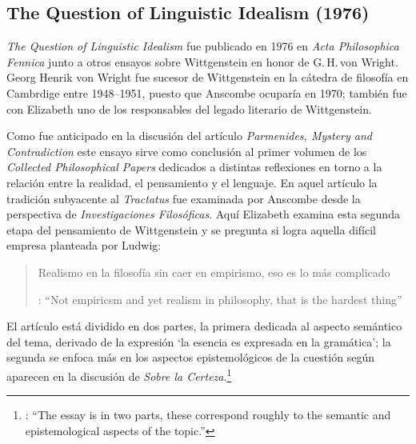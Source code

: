 \subsection{The Question of Linguistic Idealism (1976)}

\emph{The Question of Linguistic Idealism} fue publicado en 1976 en \emph{Acta Philosophica Fennica} junto a otros ensayos sobre Wittgenstein en honor de G.\,H.\,von Wright. Georg Henrik von Wright fue sucesor de Wittgenstein en la cátedra de filosofía en Cambrdige entre 1948--1951, puesto que Anscombe ocuparía en 1970; también fue con Elizabeth uno de los responsables del legado literario de Wittgenstein.

Como fue anticipado en la discusión del artículo \emph{Parmenides, Mystery and Contradiction} este ensayo sirve como conclusión al primer volumen de los \emph{Collected Philosophical Papers} dedicados a distintas reflexiones en torno a la relación entre la realidad, el pensamiento y el lenguaje. En aquel artículo la tradición subyacente al \emph{Tractatus} fue examinada por Anscombe desde la perspectiva de \emph{Investigaciones Filosóficas}. Aquí Elizabeth examina esta segunda etapa del pensamiento de Wittgenstein y se pregunta si logra aquella difícil empresa planteada por Ludwig: \blockquote[{\cite[112]{wittgenstein1956remmath}}: \enquote{Not empiricsm and yet realism in philosophy, that is the hardest thing}]{Realismo en la filosofía sin caer en empirismo, eso es lo más complicado}. El artículo está dividido en dos partes, la primera dedicada al aspecto semántico del tema, derivado de la expresión \enquote*{la esencia es expresada en la gramática}; la segunda se enfoca más en los aspectos epistemológicos de la cuestión según aparecen en la discusión de \emph{Sobre la Certeza}.\footnote{\cite[Cf.~][215]{teichmann2008ans}: \enquote{The essay is in two parts, these correspond roughly to the semantic and epistemological aspects of the topic.}}

